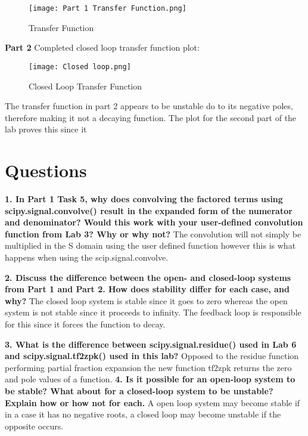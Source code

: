 \documentclass[12pt]{report}
\begin{document}
\begin{figure}[htp]
    \centering
    \texttt{[image: Part 1 Transfer Function.png]}
    \caption{Transfer Function}
    \label{fig:Part 1 Transfer Function.png}
\end{figure}
\newpage
\textbf{Part 2}
\newline
Completed closed loop transfer function plot: 
\begin{figure}[htp]
    \centering
    \texttt{[image: Closed loop.png]}
    \caption{Closed Loop Transfer Function}
    \label{fig:Closed Loop Transfer Function.png}
\end{figure}
The transfer function in part 2 appears to be unstable do to its negative poles, therefore making it not a decaying function.
The plot for the second part of the lab proves this since it 
\newpage
\section{Questions}
\textbf{1. In Part 1 Task 5, why does convolving the factored terms using scipy.signal.convolve()
result in the expanded form of the numerator and denominator? Would this work with your
user-defined convolution function from Lab 3? Why or why not?}\newline
The convolution will not simply be multiplied in the S domain using the user defined function however this is what happens when using the scip.signal.convolve. \newline \newline

\textbf{2. Discuss the difference between the open- and closed-loop systems from Part 1 and Part 2.
How does stability differ for each case, and why?}\newline
The closed loop system is stable since it goes to zero whereas the open system is not stable since it proceeds to infinity. The feedback loop is responsible for this since it forces the function to decay. \newline \newline

\textbf{3. What is the difference between scipy.signal.residue() used in Lab 6 and
scipy.signal.tf2zpk() used in this lab?
}\newline
Opposed to the residue function performing partial fraction expansion the new function tf2zpk returns the zero and pole values of a function.\newline \newline
\textbf{4. Is it possible for an open-loop system to be stable? What about for a closed-loop system to
be unstable? Explain how or how not for each.}\newline
A open loop system may become stable if in a case it has no negative roots, a closed loop may become unstable if the opposite occurs. 
\newline
\end{document}
